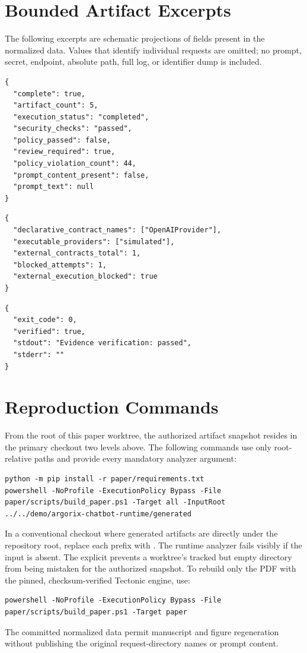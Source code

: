 \section{Bounded Artifact Excerpts}\label{app:excerpts}

The following excerpts are schematic projections of fields present in the
normalized data.  Values that identify individual requests are omitted; no
prompt, secret, endpoint, absolute path, full log, or identifier dump is
included.

\begin{lstlisting}[float=!ht,caption={Redacted session-level projection.}]
{
  "complete": true,
  "artifact_count": 5,
  "execution_status": "completed",
  "security_checks": "passed",
  "policy_passed": false,
  "review_required": true,
  "policy_violation_count": 44,
  "prompt_content_present": false,
  "prompt_text": null
}
\end{lstlisting}

\begin{lstlisting}[float=!ht,caption={Redacted provider-boundary projection.}]
{
  "declarative_contract_names": ["OpenAIProvider"],
  "executable_providers": ["simulated"],
  "external_contracts_total": 1,
  "blocked_attempts": 1,
  "external_execution_blocked": true
}
\end{lstlisting}

\begin{lstlisting}[float=!ht,caption={Bounded verification-result projection.}]
{
  "exit_code": 0,
  "verified": true,
  "stdout": "Evidence verification: passed",
  "stderr": ""
}
\end{lstlisting}

\section{Reproduction Commands}\label{app:reproduce}

From the root of this paper worktree, the authorized artifact snapshot resides
in the primary checkout two levels above.  The following commands use only
root-relative paths and provide every mandatory analyzer argument:

\begin{lstlisting}
python -m pip install -r paper/requirements.txt
powershell -NoProfile -ExecutionPolicy Bypass -File paper/scripts/build_paper.ps1 -Target all -InputRoot ../../demo/argorix-chatbot-runtime/generated
\end{lstlisting}

In a conventional checkout where generated artifacts are directly under the
repository root, replace each  prefix with .
The runtime analyzer fails visibly if the input is absent.  The explicit
 prevents a worktree's tracked but empty
 directory from being mistaken for the authorized
snapshot.  To rebuild only the PDF with the pinned, checksum-verified Tectonic
engine, use:

\begin{lstlisting}
powershell -NoProfile -ExecutionPolicy Bypass -File paper/scripts/build_paper.ps1 -Target paper
\end{lstlisting}

The committed normalized data permit manuscript and figure regeneration
without publishing the original request-directory names or prompt content.
